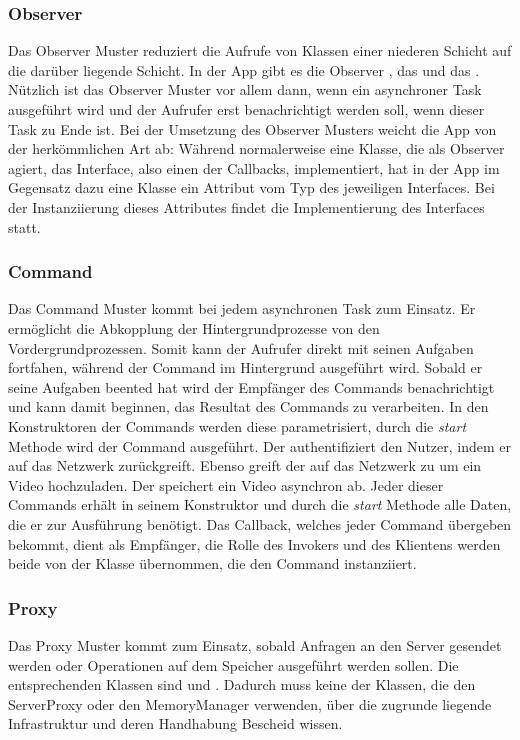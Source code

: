 \subsubsection{Observer}
Das Observer Muster reduziert die Aufrufe von Klassen einer niederen Schicht auf die darüber liegende Schicht. In der App gibt es die Observer , das  und das . Nützlich ist das Observer Muster vor allem dann, wenn ein asynchroner Task ausgeführt wird und der Aufrufer erst benachrichtigt werden soll, wenn dieser Task zu Ende ist.\newline
Bei der Umsetzung des Observer Musters weicht die App von der herkömmlichen Art ab: Während normalerweise eine Klasse, die als Observer agiert, das Interface, also einen der Callbacks, implementiert, hat in der App im Gegensatz dazu eine Klasse ein Attribut vom Typ des jeweiligen Interfaces. Bei der Instanziierung dieses Attributes findet die Implementierung des Interfaces statt.

\subsubsection{Command}
Das Command Muster kommt bei jedem asynchronen Task zum Einsatz. Er ermöglicht die Abkopplung der Hintergrundprozesse von den Vordergrundprozessen. Somit kann der Aufrufer direkt mit seinen Aufgaben fortfahen, während der Command im Hintergrund ausgeführt wird. Sobald er seine Aufgaben beented hat wird der Empfänger des Commands benachrichtigt und kann damit beginnen, das Resultat des Commands zu verarbeiten.\newline
In den Konstruktoren der Commands werden diese parametrisiert, durch die \textit{start} Methode wird der Command ausgeführt. Der  authentifiziert den Nutzer, indem er auf das Netzwerk zurückgreift. Ebenso greift der  auf das Netzwerk zu um ein Video hochzuladen. Der  speichert ein Video asynchron ab. Jeder dieser Commands erhält in seinem Konstruktor und durch die \textit{start} Methode alle Daten, die er zur Ausführung benötigt. Das Callback, welches jeder Command übergeben bekommt, dient als Empfänger, die Rolle des Invokers und des Klientens werden beide von der Klasse übernommen, die den Command instanziiert.

\subsubsection{Proxy}
Das Proxy Muster kommt zum Einsatz, sobald Anfragen an den Server gesendet werden oder Operationen auf dem Speicher ausgeführt werden sollen. Die entsprechenden Klassen sind  und . Dadurch muss keine der Klassen, die den ServerProxy oder den MemoryManager verwenden, über die zugrunde liegende Infrastruktur und deren Handhabung Bescheid wissen.

